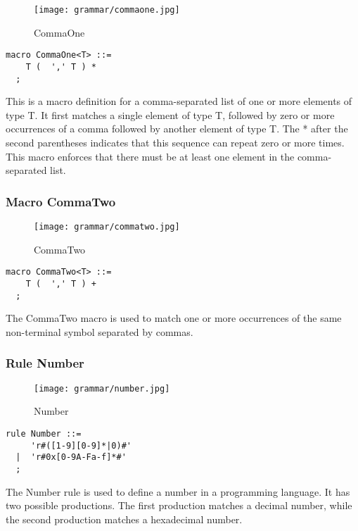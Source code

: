 \begin{figure}
  \centering
  \texttt{[image: grammar/commaone.jpg]}
  \caption{CommaOne}
  \end{figure}

\begin{lstlisting}
macro CommaOne<T> ::=
    T (  ',' T ) *  
  ;
\end{lstlisting}

This is a macro definition for a comma-separated list of one or more elements of type T. It first matches a single element of type T, followed by zero or more occurrences of a comma followed by another element of type T. The * after the second parentheses indicates that this sequence can repeat zero or more times. This macro enforces that there must be at least one element in the comma-separated list.

\subsubsection*{Macro CommaTwo}

\begin{figure}
  \centering
  \texttt{[image: grammar/commatwo.jpg]}
  \caption{CommaTwo}
  \end{figure}

\begin{lstlisting}
macro CommaTwo<T> ::=
    T (  ',' T ) +  
  ;
\end{lstlisting}

The CommaTwo macro is used to match one or more occurrences of the same non-terminal symbol separated by commas.

\subsubsection*{Rule Number}

\begin{figure}
  \centering
  \texttt{[image: grammar/number.jpg]}
  \caption{Number}
  \end{figure}

\begin{lstlisting}
rule Number ::=
     'r#([1-9][0-9]*|0)#' 
  |  'r#0x[0-9A-Fa-f]*#' 
  ;
\end{lstlisting}

The Number rule is used to define a number in a programming language. It has two possible productions. The first production matches a decimal number, while the second production matches a hexadecimal number.

